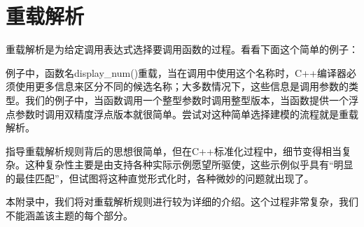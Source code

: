 \chapter{重载解析}
重载解析是为给定调用表达式选择要调用函数的过程。看看下面这个简单的例子：


例子中，函数名display\_num()重载，当在调用中使用这个名称时，C++编译器必须使用更多信息来区分不同的候选名称；大多数情况下，这些信息是调用参数的类型。我们的例子中，当函数调用一个整型参数时调用整型版本，当函数提供一个浮点参数时调用双精度浮点版本就很简单。尝试对这种简单选择建模的流程就是重载解析。

指导重载解析规则背后的思想很简单，但在C++标准化过程中，细节变得相当复杂。这种复杂性主要是由支持各种实际示例愿望所驱使，这些示例似乎具有“明显的最佳匹配”，但试图将这种直觉形式化时，各种微妙的问题就出现了。

本附录中，我们将对重载解析规则进行较为详细的介绍。这个过程非常复杂，我们不能涵盖该主题的每个部分。



























